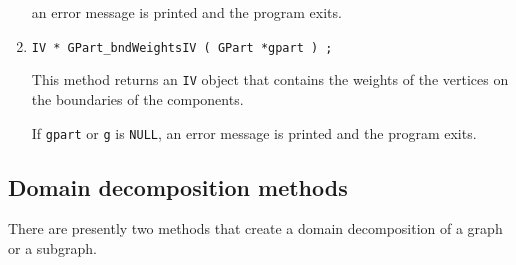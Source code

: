 \begin{enumerate}
an error message is printed and the program exits.
\item
\begin{verbatim}
IV * GPart_bndWeightsIV ( GPart *gpart ) ;
\end{verbatim}
This method returns an {\tt IV} object that contains the weights of
the vertices on the boundaries of the components.
\par {}
If {\tt gpart} or {\tt g} is {\tt NULL},
an error message is printed and the program exits.
\end{enumerate}
\par
\subsection{Domain decomposition methods}
\label{subsection:GPart:proto:domain-decomposition}
\par
There are presently two methods that create a domain decomposition 
of a graph or a subgraph.
\par
